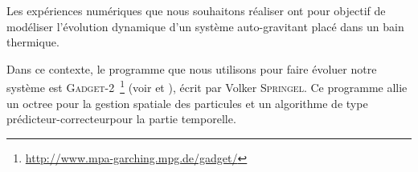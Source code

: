 		Les expériences numériques que nous souhaitons réaliser ont pour objectif de modéliser l'évolution
		dynamique d'un système auto-gravitant placé dans un bain thermique.


		Dans ce contexte, le programme que nous utilisons pour faire évoluer notre système est
		\textsc{Gadget-2}~\footnote{\url{http://www.mpa-garching.mpg.de/gadget/}} (voir \cite{gadget2} et \cite{gadget1}),
		écrit par Volker \textsc{Springel}.
		Ce programme allie un octree pour la gestion spatiale des particules et un algorithme de type \og
		prédicteur-correcteur\fg pour la partie temporelle.



